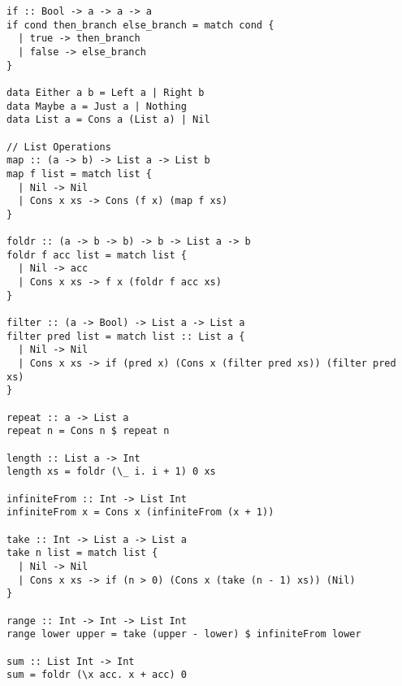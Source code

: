 \begin{lstlisting}[language=SFL]
if :: Bool -> a -> a -> a
if cond then_branch else_branch = match cond {
  | true -> then_branch
  | false -> else_branch
}

data Either a b = Left a | Right b
data Maybe a = Just a | Nothing
data List a = Cons a (List a) | Nil

// List Operations
map :: (a -> b) -> List a -> List b
map f list = match list {
  | Nil -> Nil
  | Cons x xs -> Cons (f x) (map f xs)
}

foldr :: (a -> b -> b) -> b -> List a -> b
foldr f acc list = match list {
  | Nil -> acc
  | Cons x xs -> f x (foldr f acc xs)
}

filter :: (a -> Bool) -> List a -> List a
filter pred list = match list :: List a {
  | Nil -> Nil
  | Cons x xs -> if (pred x) (Cons x (filter pred xs)) (filter pred xs)
}

repeat :: a -> List a
repeat n = Cons n $ repeat n

length :: List a -> Int
length xs = foldr (\_ i. i + 1) 0 xs

infiniteFrom :: Int -> List Int
infiniteFrom x = Cons x (infiniteFrom (x + 1))

take :: Int -> List a -> List a
take n list = match list {
  | Nil -> Nil
  | Cons x xs -> if (n > 0) (Cons x (take (n - 1) xs)) (Nil)
}

range :: Int -> Int -> List Int
range lower upper = take (upper - lower) $ infiniteFrom lower

sum :: List Int -> Int
sum = foldr (\x acc. x + acc) 0
\end{lstlisting}